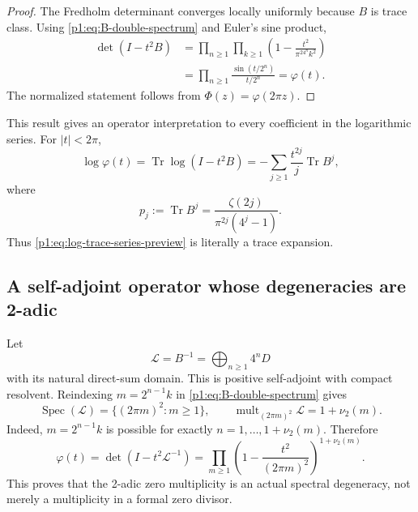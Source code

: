 \documentclass[11pt,oneside]{article}
\theoremstyle{definition}
\newcommand{\Tr}{\operatorname{Tr}}
\newcommand{\Spec}{\operatorname{Spec}}
\newcommand{\vtwo}{\nu_2}
\newcommand{\PhiF}{\Phi}
\newcommand{\phiF}{\varphi}
\begin{document}
\begin{proof}
The Fredholm determinant converges locally uniformly because \(B\) is trace class.
Using \eqref{p1:eq:B-double-spectrum} and Euler's sine product,
\begin{align*}
 \det(I-t^2B)
 &=\prod_{n\ge1}\prod_{k\ge1}
   \left(1-\frac{t^2}{\pi^24^nk^2}\right)\\
 &=\prod_{n\ge1}\frac{\sin(t/2^n)}{t/2^n}
 =\phiF(t).
\end{align*}
The normalized statement follows from \(\PhiF(z)=\phiF(2\pi z)\).
\end{proof}

This result gives an operator interpretation to every coefficient in the logarithmic
series.  For \(|t|<2\pi\),
\begin{equation}
 \log\phiF(t)=\Tr\log(I-t^2B)
 =-\sum_{j\ge1}\frac{t^{2j}}j\Tr B^j,
 \label{p1:eq:operator-log}
\end{equation}
where
\begin{equation}
 \boxed{\quad
 p_j:=\Tr B^j
 =\frac{\zeta(2j)}{\pi^{2j}(4^j-1)}.
 \quad}
 \label{p1:eq:power-traces}
\end{equation}
Thus \eqref{p1:eq:log-trace-series-preview} is literally a trace expansion.

\subsection{A self-adjoint operator whose degeneracies are 2-adic}

Let
\begin{equation}
 \mathscr L=B^{-1}
 =\bigoplus_{n\ge1}4^nD
 \label{p1:eq:L-operator}
\end{equation}
with its natural direct-sum domain.  This is positive self-adjoint with compact
resolvent.  Reindexing \(m=2^{n-1}k\) in \eqref{p1:eq:B-double-spectrum} gives
\begin{equation}
 \Spec(\mathscr L)=
 \bigl\{(2\pi m)^2:m\ge1\bigr\},
 \qquad
 \operatorname{mult}_{(2\pi m)^2}\mathscr L=1+\vtwo(m).
 \label{p1:eq:L-spectrum}
\end{equation}
Indeed, \(m=2^{n-1}k\) is possible for exactly
\(n=1,\ldots,1+\vtwo(m)\).  Therefore
\begin{equation}
 \phiF(t)=\det(I-t^2\mathscr L^{-1})
 =\prod_{m\ge1}\left(1-\frac{t^2}{(2\pi m)^2}\right)^{1+\vtwo(m)}.
 \label{p1:eq:angular-canonical}
\end{equation}
This proves that the 2-adic zero multiplicity is an actual spectral degeneracy, not
merely a multiplicity in a formal zero divisor.
\end{document}
